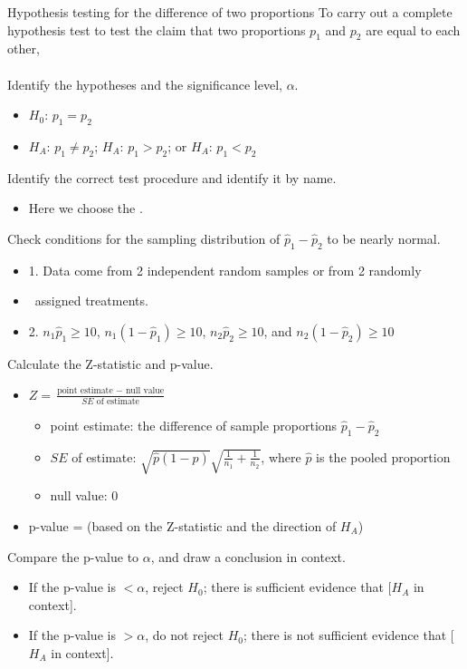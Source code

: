  

\begin{onebox}{Hypothesis testing for the difference of two proportions}
To carry out a complete hypothesis test to test the claim that two proportions $p_1$ and $p_2$ are equal to each other,
\\
\\
 Identify the hypotheses and the significance level, $\alpha$.
\begin{itemize}\vspace{-1mm}
\setlength{\itemsep}{0mm}
\item[] $H_0$: $p_1=p_2$ 
\item[] $H_A$: $p_1\ne p_2$; \quad $H_A$: $p_1>p_2$; \quad or \quad $H_A$: $p_1<p_2$ 
\end{itemize}
  Identify the correct test procedure and identify it by name.\vspace{-1mm}
\begin{itemize}
\item[] Here we choose the .
\end{itemize}
  Check conditions for the sampling distribution of $\hat{p}_1-\hat{p}_2$ to be nearly normal.\vspace{-1mm}
\begin{itemize}
\setlength{\itemsep}{0mm}
\item[] 1.  Data come from 2 independent random samples or from 2 randomly
\item[] \quad \  assigned treatments.
\item[] 2.  $n_1\hat{p}_1\geq 10$, $n_1(1-\hat{p}_1)\geq 10$, $n_2\hat{p}_2\geq 10$, and $n_2(1-\hat{p}_2)\geq 10$
\end{itemize}
   Calculate the Z-statistic and p-value.
\begin{itemize}
\item[] $Z = \frac{\text{point estimate } - \text{ null value}}{SE \text{ of estimate}}$
\begin{itemize}
\item[] point estimate: the difference of sample proportions $\hat{p}_1 - \hat{p}_2$
\item[] $SE$ of estimate:  $\sqrt{\hat{p}(1-\hat{p})}\sqrt{\frac{1}{n_1} + \frac{1}{n_2}}$, where $\hat{p}$ is the pooled proportion
\item[] null value: 0
\end{itemize}
\item[] p-value = (based on the Z-statistic and the direction of $H_A$)
\end{itemize}
  Compare the p-value to $\alpha$, and draw a conclusion in context.\vspace{-1mm}
\begin{itemize}
\item[] If the p-value is $< \alpha$, reject $H_0$; there is sufficient evidence that [$H_A$ in context]. 
\item[] If the p-value is $> \alpha$, do not reject $H_0$; there is not sufficient evidence that [$H_A$ in context].
\end{itemize}\end{onebox}


